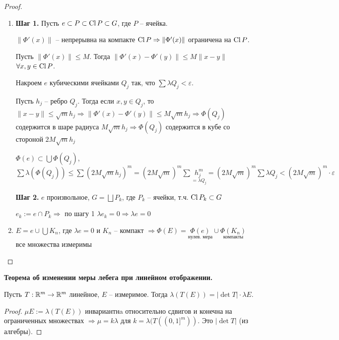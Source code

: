 \begin{proof}~
    \begin{enumerate}
        \item \textbf{Шаг 1.} Пусть $e\subset P\subset \operatorname{Cl} P\subset G$, где $P$ – ячейка.
        
        $\|\Phi'(x)\|$ – непрерывна на компакте $\operatorname{Cl} P\Rightarrow \|\Phi'(x)\|$ ограничена
        на $\operatorname{Cl} P$. 
        
        Пусть $\|\Phi'(x)\|\leq M$. Тогда $\|\Phi'(x)-\Phi'(y)\|\leq M\|x-y\|$ $\forall x, y\in \operatorname{Cl} P$.

        Накроем $e$ кубическими ячейками $Q_j$ так, что $\sum \lambda Q_j<\varepsilon$.

        Пусть $h_j$ – ребро $Q_j$. Тогда если $x, y\in Q_j$, то $\|x - y\|\leq \sqrt{m}h_j\Rightarrow
        \|\Phi'(x)-\Phi'(y)\|\leq M\sqrt{m}h_j\Rightarrow \Phi(Q_j)$ содержится в шаре радиуса $M\sqrt{m}h_j\Rightarrow
        \Phi(Q_j)$ содержится в кубе со стороной $2M\sqrt{m}h_j$

        $\Phi(e)\subset \bigcup\Phi(Q_j)$, $\sum \lambda (\Phi(Q_j))\leq \sum (2M\sqrt{m}h_j)^m=(2M\sqrt{m})^m 
        \sum \underset{=\lambda Q_j}{h_j^m}=(2M\sqrt{m})^m \sum \lambda Q_j<(2M\sqrt{m})^m\cdot \varepsilon$

        \textbf{Шаг 2.} $e$ произвольное, $G=\bigsqcup P_k$, где $P_k$ – ячейки, т.ч. $\operatorname{Cl} P_k\subset G$

        $e_k:=e\cap P_k\Rightarrow$ по шагу 1 $\lambda e_k=0\Rightarrow \lambda e=0$

        \item $E=e\cup \bigcup K_n$, где $\lambda e=0$ и $K_n$ – компакт $\Rightarrow\Phi(E)=
        \underset{\text{нулев. мера}}{\Phi(e)}\cup \underset{\text{компакты}}{\Phi(K_n)}$ все множества измеримы
    \end{enumerate}
\end{proof}


\begin{theorem}
    \textbf{Теорема об изменении меры лебега при линейном отображении.}

    Пусть $T:\mathbb{R}^m\rightarrow \mathbb{R}^m$ линейное, $E$ – измеримое. Тогда $\lambda(T(E))=|\det T|\cdot \lambda E$.
\end{theorem}

\begin{proof}
    $\mu E := \lambda (T(E))$ инвариантнa относительно сдвигов и конечна на ограниченных множествах 
    $\Rightarrow \mu = k\lambda$ для $k=\lambda (T((0, 1]^m))$. Это $|\det T|$ (из алгебры).
\end{proof}


